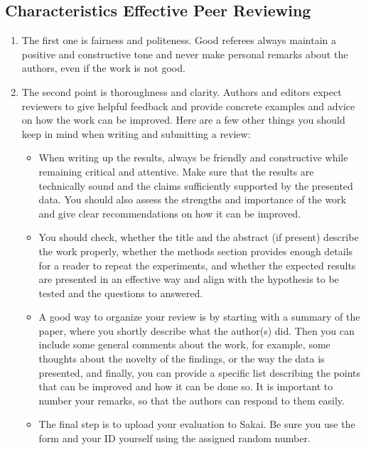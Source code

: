 \documentclass{tufte-handout}\usepackage[]{graphicx}\usepackage[]{color}
\begin{document}
\subsection{Characteristics Effective Peer Reviewing}

\begin{enumerate}
	\item The first one is fairness and politeness. Good referees always maintain a positive and constructive tone and never make personal remarks about the authors, even if the work is not good. 
	\item The second point is thoroughness and clarity. Authors and editors expect reviewers to give helpful feedback and provide concrete examples and advice on how the work can be improved. Here are a few other things you should keep in mind when writing and submitting a review:
  \begin{itemize}
    \item When writing up the results, always be friendly and constructive while remaining critical and attentive. Make sure that the results are technically sound and the claims sufficiently supported by the presented data. You should also assess the strengths and importance of the work and give clear recommendations on how it can be improved.
    \item You should check, whether the title and the abstract (if present) describe the work properly, whether the methods section provides enough details for a reader to repeat the experiments, and whether the expected results are presented in an effective way and align with the hypothesis to be tested and the questions to answered.
    \item A good way to organize your review is by starting with a summary of the paper, where you shortly describe what the author(s) did. Then you can include some general comments about the work, for example, some thoughts about the novelty of the findings, or the way the data is presented, and finally, you can provide a specific list describing the points that can be improved and how it can be done so. It is important to number your remarks, so that the authors can respond to them easily.
    \item The final step is to upload your evaluation to Sakai. Be sure you use the form and your ID yourself using the assigned random number. 
    
  \end{itemize}
  
\end{enumerate}
\end{document}
